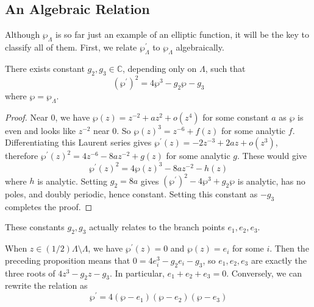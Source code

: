 \subsection{An Algebraic Relation}
Although $\wp_\Lambda$ is so far just an example of an elliptic function, it will be the key to classify all of them.
First, we relate $\wp_\Lambda^\prime$ to $\wp_\Lambda$ algebraically.
\begin{proposition}\label{elliptic_wp}
    There exists constant $g_2,g_3\in\mathbb C$, depending only on $\Lambda$, such that
    $$(\wp^\prime)^2=4\wp^3-g_2\wp-g_3$$
    where $\wp=\wp_\Lambda$.
\end{proposition}
\begin{proof}
    Near $0$, we have $\wp(z)=z^{-2}+az^2+o(z^4)$ for some constant $a$ as $\wp$ is even and looks like $z^{-2}$ near $0$.
    So $\wp(z)^3=z^{-6}+f(z)$ for some analytic $f$.
    Differentiating this Laurent series gives $\wp^\prime(z)=-2z^{-3}+2az+o(z^3)$, therefore $\wp^\prime(z)^2=4z^{-6}-8az^{-2}+g(z)$ for some analytic $g$.
    These would give
    $$\wp^\prime(z)^2=4\wp(z)^3-8az^{-2}-h(z)$$
    where $h$ is analytic.
    Setting $g_2=8a$ gives $(\wp^\prime)^2-4\wp^3+g_2\wp$ is analytic, has no poles, and doubly periodic, hence constant.
    Setting this constant as $-g_3$ completes the proof.
\end{proof}
These constants $g_2,g_3$ actually relates to the branch points $e_1,e_2,e_3$.
\begin{remark}
    When $z\in (1/2)\Lambda\setminus\Lambda$, we have $\wp^\prime(z)=0$ and $\wp(z)=e_i$ for some $i$.
    Then the preceding proposition means that $0=4e_i^3-g_2e_i-g_3$, so $e_1,e_2,e_3$ are exactly the three roots of $4z^3-g_2z-g_3$.
    In particular, $e_1+e_2+e_3=0$.
    Conversely, we can rewrite the relation as
    $$\wp^\prime=4(\wp-e_1)(\wp-e_2)(\wp-e_3)$$
\end{remark}